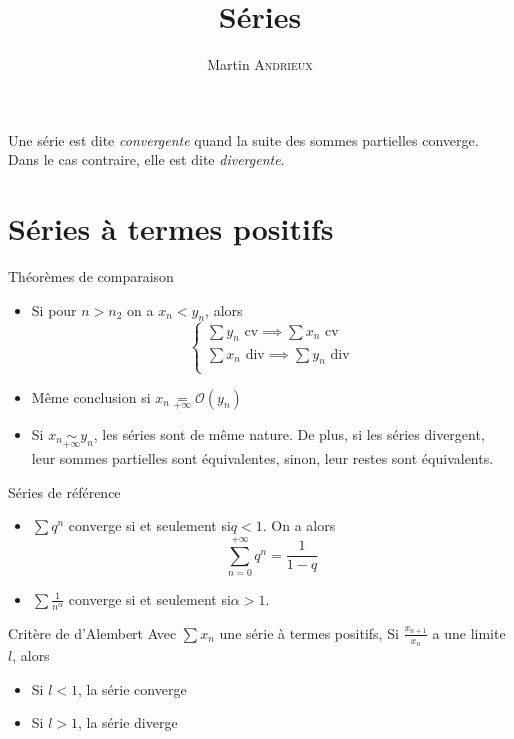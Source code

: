 \documentclass[french, a4paper, 11pt, twocolumn]{article}
\title{Séries}
\author{Martin \textsc{Andrieux}}
\date{}
\newcommand{\ssi}{si et seulement si\xspace}		%
\newcommand{\inv}[1]{\dfrac{1}{#1}}
\begin{document}
\maketitle

\begin{definition}
  Une série est dite \emph{convergente} quand la suite des sommes partielles converge. Dans le cas contraire, elle est dite \emph{divergente}.
\end{definition}

\section{Séries à termes positifs}
\begin{theoreme}{Théorèmes de comparaison}
  \begin{itemize}[label=$\bullet$]
    \item Si pour $n>n_{2}$ on a $x_{n}<y_{n}$, alors
      \[\begin{cases}
          \sum y_{n} \text{ cv} \implies \sum x_{n} \text{ cv}\\
          \sum x_{n} \text{ div} \implies \sum y_{n} \text{ div}\\
      \end{cases}\]
    \item Même conclusion si $x_{n} \underset{+\infty}{=} \mathcal{O}(y_{n})$
    \item Si $x_{n} \underset{+\infty}{\sim} y_{n}$, les séries sont de même nature. De plus, si les séries divergent, leur sommes partielles sont équivalentes, sinon, leur restes sont équivalents.
  \end{itemize}
\end{theoreme}

\begin{theoreme}{Séries de référence}
  \begin{itemize}[label=$\bullet$]
    \item $\sum q^{n}$ converge \ssi $q<1$. On a alors
      \[\sum_{n=0}^{+\infty}q^{n} = \inv{1-q}\]
    \item $\sum \frac{1}{n^{\alpha}}$ converge \ssi$\alpha > 1$.
  \end{itemize}
\end{theoreme}

\begin{theoreme}{Critère de d'Alembert}
  Avec $\sum x_{n}$ une série à termes positifs,
  Si $\frac{x_{n+1}}{x_{n}}$ a une limite $l$, alors
  \begin{itemize}[label=$\bullet$]
    \item Si $l<1$, la série converge
    \item Si $l>1$, la série diverge
  \end{itemize}
\end{theoreme}
\end{document}
